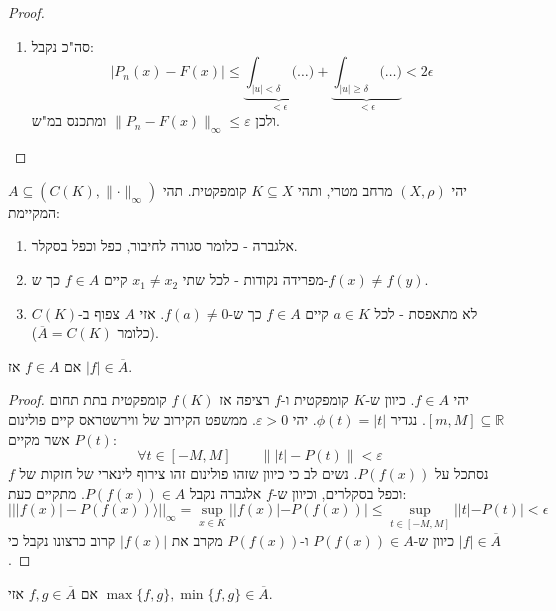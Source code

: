 \documentclass{tstextbook}
\begin{document}
\begin{proof}
\begin{enumerate}
    \item סה"כ נקבל: 
$$|P_{n}(x)-F(x)|\leq\underbrace{\int_{|u|<\delta}\bigl(\dots\bigr)}_{<\epsilon}+\underbrace{\int_{|u|\geq\delta}\bigl(\dots\bigr)}_{<\epsilon}<2\epsilon$$
ולכן \(\lVert P_{n}-F(x) \rVert_{\infty}\leq \varepsilon\) ומתכנס במ"ש.


  \end{enumerate}
\end{proof}
\begin{theorem}
יהי \((X,\rho)\) מרחב מטרי, ותהי \(K\subseteq X\) קומפקטית. תהי \(A\subseteq(C(K),\lVert \cdot \rVert_{\infty})\) המקיימת:

  \begin{enumerate}
    \item אלגברה - כלומר סגורה לחיבור, כפל וכפל בסקלר. 


    \item מפרידה נקודות - לכל שתי \(x_{1}\neq x_{2}\) קיים \(f \in A\) כך ש-\(f(x)\neq f(y)\). 


    \item לא מתאפסת - לכל \(a \in K\) קיים \(f \in A\) כך ש-\(f(a)\neq 0\). 
אזי \(A\) צפוף ב-\(C(K)\)(כלומר \(\overline{A}=C(K)\)).


  \end{enumerate}
\end{theorem}
\begin{lemma}
אם \(f \in A\) אז \(\lvert f \rvert\in \overline{A}\).

\end{lemma}
\begin{proof}
יהי \(f \in A\). כיוון ש-\(K\) קומפקטית ו-\(f\) רציפה אז \(f(K)\) קומפקטית בתת תחום \([m,M]\subseteq \mathbb{R}\).
נגדיר \(\phi(t)=\lvert t \rvert\). יהי \(\varepsilon> 0\). ממשפט הקירוב של ווירשטראס קיים פולינום \(P(t)\) אשר מקיים:
$$\forall t \in [-M,M]\qquad \lVert \lvert t \rvert -P(t) \rVert <\varepsilon$$
נסתכל על \(P(f(x))\). נשים לב כי כיוון שזהו פולינום זהו צירוף לינארי של חזקות של \(f\) וכפל בסקלרים, וכיוון ש-\(f\) אלגברה נקבל \(P(f(x))\in A\). מתקיים כעת:
$$|||f(x)|-P(f(x))\rangle||_{\infty}=\operatorname*{sup}_{x\in K}||f(x)|-P(f(x))|\leq\operatorname*{sup}_{t\in[-M,M]}||t|-P(t)|<\epsilon$$
כיוון ש-\(P(f(x))\in A\) ו-\(P(f(x))\) מקרב את \(\lvert f(x) \rvert\) קרוב כרצונו נקבל כי \(\lvert f \rvert\in \overline{A}\).

\end{proof}
\begin{lemma}
אם \(f,g \in \overline{A}\) אזי \(\max\{ f,g \},\min\{ f,g \}\in \overline{A}\).

\end{lemma}
\end{document}
